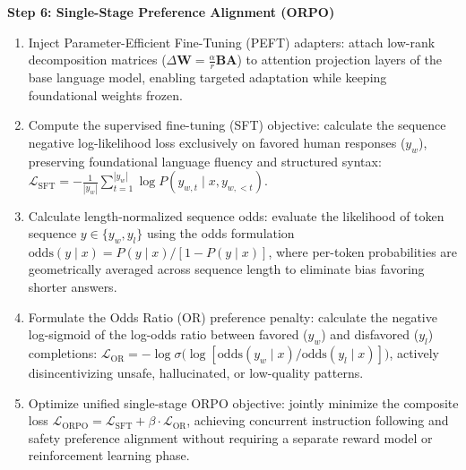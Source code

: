 \documentclass[11pt,a4paper]{article}
\begin{document}
\textbf{Step 6: Single-Stage Preference Alignment (ORPO)}
\begin{enumerate}[leftmargin=1.8em, itemsep=0.22em, topsep=0.06em]
    \item Inject Parameter-Efficient Fine-Tuning (PEFT) adapters: attach low-rank decomposition matrices ($\Delta \mathbf{W} = \frac{\alpha}{r} \mathbf{B}\mathbf{A}$) to attention projection layers of the base language model, enabling targeted adaptation while keeping foundational weights frozen.
    \item Compute the supervised fine-tuning (SFT) objective: calculate the sequence negative log-likelihood loss exclusively on favored human responses ($y_w$), preserving foundational language fluency and structured syntax: $\mathcal{L}_{\mathrm{SFT}} = -\frac{1}{|y_w|} \sum_{t=1}^{|y_w|} \log P(y_{w,t} \mid x, y_{w,<t})$.
    \item Calculate length-normalized sequence odds: evaluate the likelihood of token sequence $y \in \{y_w, y_l\}$ using the odds formulation $\mathrm{odds}(y \mid x) = P(y \mid x) / [1 - P(y \mid x)]$, where per-token probabilities are geometrically averaged across sequence length to eliminate bias favoring shorter answers.
    \item Formulate the Odds Ratio (OR) preference penalty: calculate the negative log-sigmoid of the log-odds ratio between favored ($y_w$) and disfavored ($y_l$) completions: $\mathcal{L}_{\mathrm{OR}} = -\log \sigma \big(\log [\mathrm{odds}(y_w \mid x) / \mathrm{odds}(y_l \mid x)]\big)$, actively disincentivizing unsafe, hallucinated, or low-quality patterns.
    \item Optimize unified single-stage ORPO objective: jointly minimize the composite loss $\mathcal{L}_{\mathrm{ORPO}} = \mathcal{L}_{\mathrm{SFT}} + \beta \cdot \mathcal{L}_{\mathrm{OR}}$, achieving concurrent instruction following and safety preference alignment without requiring a separate reward model or reinforcement learning phase.
\end{enumerate}
\end{document}
